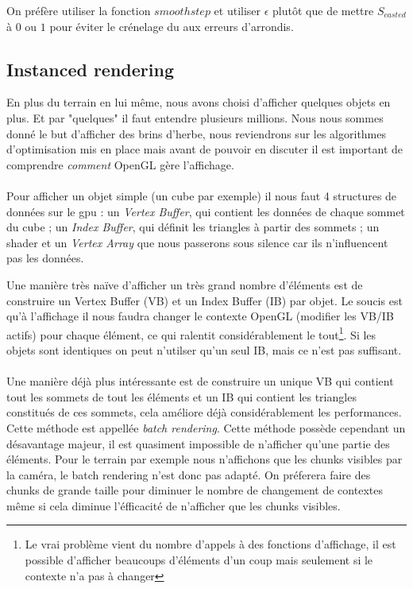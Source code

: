 \documentclass[11pt]{article} %
\begin{document}
On préfère utiliser la fonction $smoothstep$ et utiliser $\epsilon$ plutôt que de mettre $S_{casted}$ à $0$ ou $1$ pour éviter le crénelage du aux erreurs d'arrondis.


\subsection{Instanced rendering}
\label{section:instanced_rendering}

En plus du terrain en lui même, nous avons choisi d'afficher quelques objets en plus. Et par "quelques" il faut entendre plusieurs millions. Nous nous sommes donné le but d'afficher des brins d'herbe, nous reviendrons sur les algorithmes d'optimisation mis en place mais avant de pouvoir en discuter il est important de comprendre \textit{comment} OpenGL gère l'affichage.
\paragraph{}
Pour afficher un objet simple (un cube par exemple) il nous faut 4 structures de données sur le gpu : un \textit{Vertex Buffer}, qui contient les données de chaque sommet du cube ; un \textit{Index Buffer}, qui définit les triangles à partir des sommets ; un shader et un \textit{Vertex Array} que nous passerons sous silence car ils n'influencent pas les données.

Une manière très naïve d'afficher un très grand nombre d'éléments est de construire un Vertex Buffer (VB) et un Index Buffer (IB) par objet. Le soucis est qu'à l'affichage il nous faudra changer le contexte OpenGL (modifier les VB/IB actifs) pour chaque élément, ce qui ralentit considérablement le tout\footnote{Le vrai problème vient du nombre d'appels à des fonctions d'affichage, il est possible d'afficher beaucoups d'éléments d'un coup mais seulement si le contexte n'a pas à changer}.
Si les objets sont identiques on peut n'utilser qu'un seul IB, mais ce n'est pas suffisant.

\paragraph{}
Une manière déjà plus intéressante est de construire un unique VB qui contient tout les sommets de tout les éléments et un IB qui contient les triangles constitués de ces sommets, cela améliore déjà considérablement les performances. Cette méthode est appellée \textit{batch rendering}.
Cette méthode possède cependant un désavantage majeur, il est quasiment impossible de n'afficher qu'une partie des éléments. Pour le terrain par exemple nous n'affichons que les chunks visibles par la caméra, le batch rendering n'est donc pas adapté. On préferera faire des chunks de grande taille pour diminuer le nombre de changement de contextes même si cela diminue l'éfficacité de n'afficher que les chunks visibles.
\end{document}
